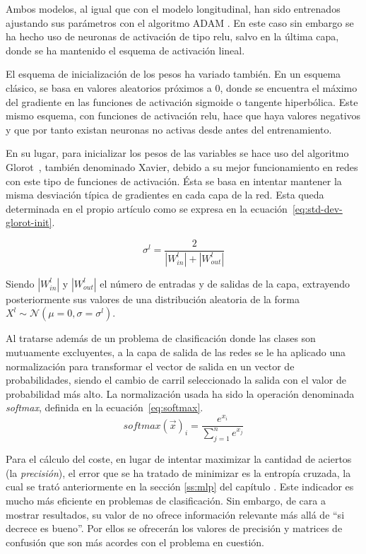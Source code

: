 Ambos modelos, al igual que con el modelo longitudinal, han sido entrenados ajustando sus parámetros con el algoritmo ADAM \cite{kingma2014adam}. En este caso sin embargo se ha hecho uso de neuronas de activación de tipo \acrshort{relu}, salvo en la última capa, donde se ha mantenido el esquema de activación lineal.

El esquema de inicialización de los pesos ha variado también. En un esquema clásico, se basa en valores aleatorios próximos a $0$, donde se encuentra el máximo del gradiente en las funciones de activación sigmoide o tangente hiperbólica. Este mismo esquema, con funciones de activación \acrshort{relu}, hace que haya valores negativos y que por tanto existan neuronas no activas desde antes del entrenamiento.

En su lugar, para inicializar los pesos de las variables se hace uso del algoritmo Glorot~\cite{glorot2010understanding}, también denominado Xavier, debido a su mejor funcionamiento en redes con este tipo de funciones de activación. Ésta se basa en intentar mantener la misma desviación típica de gradientes en cada capa de la red. Esta queda determinada en el propio artículo como se expresa en la ecuación~\ref{eq:std-dev-glorot-init}.

\begin{equation}
	\sigma^l = \frac{2}{|W^l_{in}| + |W^l_{out}|}
	\label{eq:std-dev-glorot-init}
\end{equation}

Siendo $|W^l_{in}|$ y $|W^l_{out}|$ el número de entradas y de salidas de la capa, extrayendo posteriormente sus valores de una distribución aleatoria de la forma $X^l \sim \mathcal{N}(\mu=0,\sigma=\sigma^l)$.

Al tratarse además de un problema de clasificación donde las clases son mutuamente excluyentes, a la capa de salida de las redes se le ha aplicado una normalización para transformar el vector de salida en un vector de probabilidades, siendo el cambio de carril seleccionado la salida con el valor de probabilidad más alto. La normalización usada ha sido la operación denominada \textit{softmax}, definida en la ecuación~\ref{eq:softmax}.
\begin{equation}
	softmax(\vec{x})_i = \frac{e^{x_i}}{\sum_{j=1}^n e^{x_j}}
	\label{eq:softmax}
\end{equation}

Para el cálculo del coste, en lugar de intentar maximizar la cantidad de aciertos (la \textit{precisión}), el error que se ha tratado de minimizar es la entropía cruzada, la cual se trató anteriormente en la sección \ref{ss:mlp} del capítulo . Este indicador es mucho más eficiente en problemas de clasificación. Sin embargo, de cara a mostrar resultados, su valor de no ofrece información relevante más allá de \enquote{si decrece es bueno}. Por ellos se ofrecerán los valores de precisión y matrices de confusión que son más acordes con el problema en cuestión.

